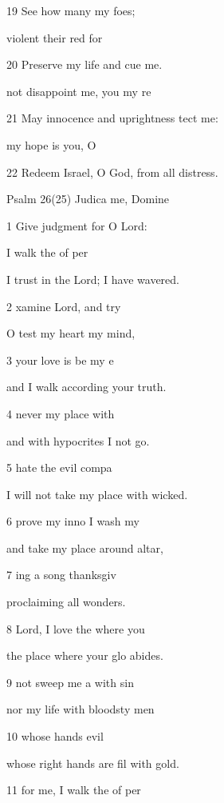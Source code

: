 19 See how many  my foes; 

 violent their red for  

20 Preserve my life and cue me. 

 not disappoint me, you  my re 

21 May innocence and uprightness tect me: 

 my hope is  you, O  

22 Redeem Israel, O God, from all  distress. 

Psalm 26(25) Judica me, Domine 


1 Give judgment for  O Lord: 

 I walk the  of per 

I trust in the Lord; I have  wavered. 

2 xamine  Lord, and try  

O test my heart  my mind, 

3  your love is be my e 

and I walk according  your truth. 

4  never  my place with  

and with hypocrites I  not go. 

5  hate the evil compa 

I will not take my place with  wicked. 

6  prove my inno I wash my  

and take my place around  altar, 

7 ing a song  thanksgiv 

proclaiming all  wonders. 

8  Lord, I love the  where you  

the place where your glo abides. 

9  not sweep me a with sin 

nor my life with bloodsty men 

10  whose hands  evil  

whose right hands are fil with gold. 

11  for me, I walk the  of per 

